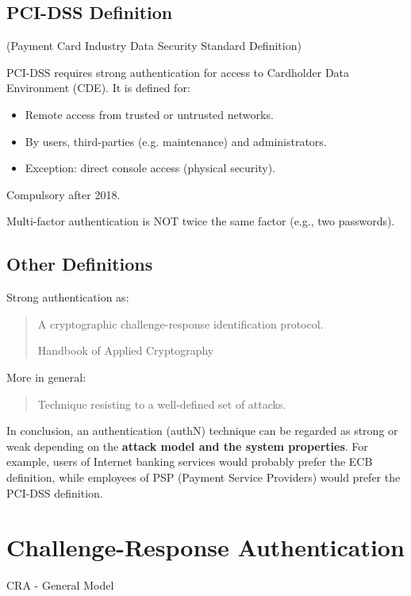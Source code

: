 \subsection*{PCI-DSS Definition}
\begin{center}
    (Payment Card Industry Data Security Standard Definition)
\end{center}
PCI-DSS requires strong authentication for access to Cardholder Data Environment (CDE). It is defined for:
\begin{itemize}
    \item Remote access from trusted or untrusted networks.
    \item By users, third-parties (e.g. maintenance) and administrators.
    \item Exception: direct console access (physical security).
\end{itemize}
Compulsory after 2018.
\begin{tcolorbox}[colback=red!10!white, colframe=red!70!black, coltitle=white, title=Beware]
Multi-factor authentication is NOT twice the same factor (e.g., two passwords).
\end{tcolorbox}

\subsection*{Other Definitions}
Strong authentication as:

\vspace{0.3cm}

\blockquote[Handbook of Applied Cryptography]{A cryptographic challenge-response identification protocol.}

\vspace{0.3cm}

\noindent More in general:

\blockquote{Technique resisting to a well-defined set of attacks.}

\vspace{0.3cm}


In conclusion, an authentication (authN) technique can be regarded as strong or weak depending on the \textbf{attack model and the system properties}. For example, users of Internet banking services would probably prefer the ECB definition, while employees of PSP (Payment Service Providers) would prefer the PCI-DSS definition.

\section{Challenge-Response Authentication}
\begin{center}
    CRA - General Model
\end{center}

